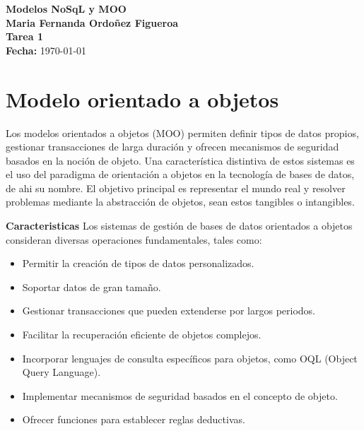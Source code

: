 \documentclass[12pt,a4paper]{article}
\begin{document}
\thispagestyle{fancy}

\vspace*{0.25cm}
\textbf{Modelos NoSqL y MOO}\\[0.25cm]
\textbf{Maria Fernanda Ordoñez Figueroa}\\[0.25cm]
\textbf{ Tarea 1}\\[0.25cm]
\textbf{Fecha:} \today

\vspace{1cm}

\section*{Modelo orientado a objetos}
Los modelos orientados a objetos (MOO) permiten definir tipos de datos propios, gestionar transacciones de larga duración y ofrecen mecanismos de seguridad basados en la noción de objeto. 
Una característica distintiva de estos sistemas es el uso del paradigma de orientación a objetos en la tecnología de bases de datos, de ahi su nombre.
El objetivo principal es representar el mundo real y resolver problemas mediante la abstracción de objetos, sean estos tangibles o intangibles.

\vspace{1cm}

\textbf{Caracteristicas}
Los sistemas de gestión de bases de datos orientados a objetos consideran diversas operaciones fundamentales, tales como:
\cite{uapaMOO}

\begin{itemize}
    \item Permitir la creación de tipos de datos personalizados.
    \item Soportar datos de gran tamaño.
    \item Gestionar transacciones que pueden extenderse por largos periodos.
    \item Facilitar la recuperación eficiente de objetos complejos.
    \item Incorporar lenguajes de consulta específicos para objetos, como OQL (Object Query Language).
    \item Implementar mecanismos de seguridad basados en el concepto de objeto.
    \item Ofrecer funciones para establecer reglas deductivas.
\end{itemize}
\end{document}
